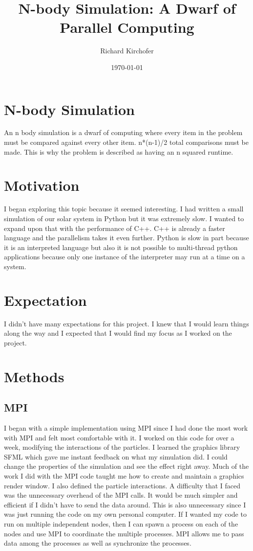 \documentclass[12pt]{article}
\title{N-body Simulation: A Dwarf of Parallel Computing}
\author{Richard Kirchofer}
\date{\today}
\begin{document}
\maketitle
\section{N-body Simulation}
An n body simulation is a dwarf of computing where every item in the problem must be compared against every other item. n*(n-1)/2 total comparisons must be made. This is why the problem is described as having an n squared runtime.
\section{Motivation}
I began exploring this topic because it seemed interesting. I had written a small simulation of our solar system in Python but it was extremely slow. I wanted to expand upon that with the performance of C++. C++ is already a faster language and the parallelism takes it even further. Python is slow in part because it is an interpreted language but also it is not possible to multi-thread python applications because only one instance of the interpreter may run at a time on a system.
\section{Expectation}
I didn't have many expectations for this project. I knew that I would learn things along the way and I expected that I would find my focus as I worked on the project.
\section{Methods}
\subsection{MPI}
I began with a simple implementation using MPI since I had done the most work with MPI and felt most comfortable with it. I worked on this code for over a week, modifying the interactions of the particles. I learned the graphics library SFML which gave me instant feedback on what my simulation did. I could change the properties of the simulation and see the effect right away. Much of the work I did with the MPI code taught me how to create and maintain a graphics render window. I also defined the particle interactions. A difficulty that I faced was the unnecessary overhead of the MPI calls. It would be much simpler and efficient if I didn't have to send the data around. This is also unnecessary since I was just running the code on my own personal computer. If I wanted my code to run on multiple independent nodes, then I can spawn a process on each of the nodes and use MPI to coordinate the multiple processes. MPI allows me to pass data among the processes as well as synchronize the processes.
\end{document}
